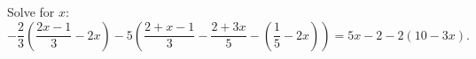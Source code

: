 Solve for $x$:
\[-\dfrac23\left(\dfrac{2x-1}{3}-2x\right)-5\left(\dfrac{2+x-1}{3}-\dfrac{2+3x}{5}-\left(\dfrac15-2x\right)\right)=5x-2-2(10-3x).\]
